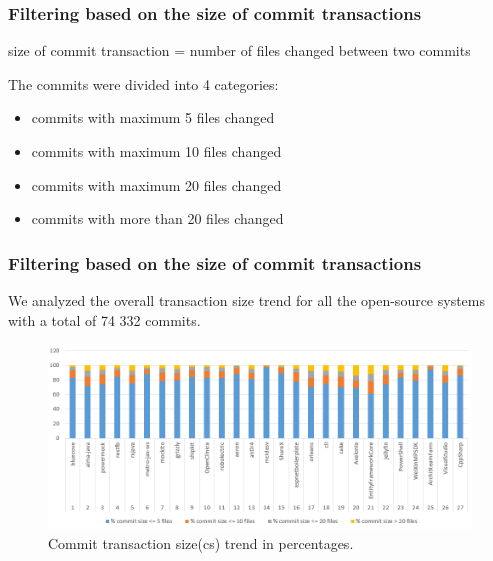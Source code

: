 \documentclass{beamer}
\begin{document}
 \begin{frame}
\frametitle{Filtering based on the size of commit transactions}

size of commit transaction = number of files changed between two commits


The commits were divided into 4 categories:

\begin{itemize}
\item commits with maximum 5 files changed
\item commits with maximum 10 files changed
\item commits with maximum 20 files changed
\item commits with more than 20 files changed
\end{itemize}
\end{frame}

 \begin{frame}
\frametitle{Filtering based on the size of commit transactions}

We analyzed the overall transaction size trend for all the open-source systems with a total of 74 332 commits.

\begin{center}
     \begin{figure}
	\includegraphics[width=\textwidth]{commit_distribution.png}
	\caption{\label{fig:fig1} Commit transaction size(cs) trend in percentages.}
     \end{figure}
\end{center}
\end{frame}
\end{document}
